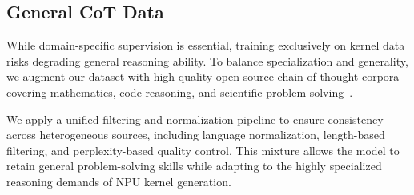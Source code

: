 \subsection{General CoT Data}
\label{general_cot}

While domain-specific supervision is essential, training exclusively on kernel data risks degrading general reasoning ability. To balance specialization and generality, we augment our dataset with high-quality open-source chain-of-thought corpora covering mathematics, code reasoning, and scientific problem solving~\cite{Chinese-Data-Distill-From-R1,AM-DeepSeek-R1-0528-Distilled,r1-dataset-collection-2025,reasoning_gemini_300k_2025}.

We apply a unified filtering and normalization pipeline to ensure consistency across heterogeneous sources, including language normalization, length-based filtering, and perplexity-based quality control. This mixture allows the model to retain general problem-solving skills while adapting to the highly specialized reasoning demands of NPU kernel generation.

